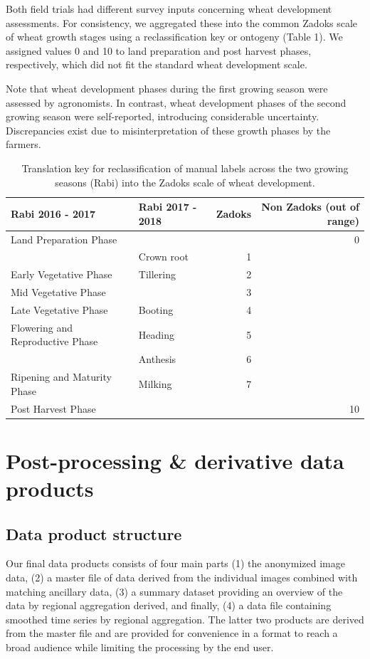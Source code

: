 \documentclass[, manuscript]{copernicus}
\begin{document}
Both field trials had different survey inputs concerning wheat
development assessments. For consistency, we aggregated these into the
common Zadoks scale of wheat growth stages \citep{zadoks1974} using a
reclassification key or ontogeny (Table 1). We assigned values 0 and 10
to land preparation and post harvest phases, respectively, which did not
fit the standard wheat development scale.

Note that wheat development phases during the first growing season were
assessed by agronomists. In contrast, wheat development phases of the
second growing season were self-reported, introducing considerable
uncertainty. Discrepancies exist due to misinterpretation of these
growth phases by the farmers.

\begin{table}[ht]
\centering
\caption{Translation key for reclassification of manual labels across the two growing seasons (Rabi) into the Zadoks scale of wheat development.} 
\begin{tabular}{llrr}
  \hline
Rabi 2016 - 2017 & Rabi 2017 - 2018 & Zadoks & Non Zadoks (out of range) \\ 
  \hline
 Land Preparation Phase &  &  &   0 \\ 
   & Crown root &   1 &  \\ 
  Early Vegetative Phase & Tillering &   2 &  \\ 
  Mid Vegetative Phase &  &   3 &  \\ 
  Late Vegetative Phase & Booting &   4 &  \\ 
  Flowering and Reproductive Phase & Heading &   5 &  \\ 
   & Anthesis &   6 &  \\ 
  Ripening and Maturity Phase & Milking &   7 &  \\ 
  Post Harvest Phase &  &  &  10 \\ 
   \hline
\end{tabular}
\end{table}

\section{Post-processing \& derivative data products}

\subsection{Data product structure}

Our final data products consists of four main parts (1) the anonymized
image data, (2) a master file of data derived from the individual images
combined with matching ancillary data, (3) a summary dataset providing
an overview of the data by regional aggregation derived, and finally,
(4) a data file containing smoothed time series by regional aggregation.
The latter two products are derived from the master file and are
provided for convenience in a format to reach a broad audience while
limiting the processing by the end user.
\end{document}
